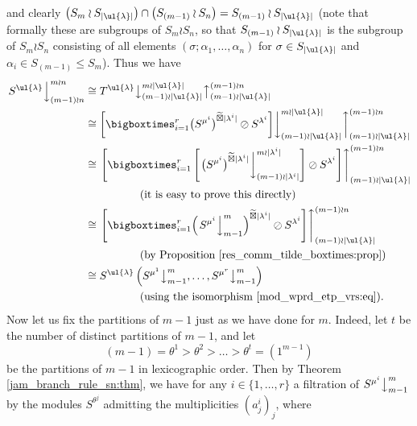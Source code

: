 and clearly $\bigl(S_m \wr S_{|\ul{\lambda}|}\bigr) \cap \bigl(S_{(m-1)} \wr S_n\bigr) = S_{(m-1)} \wr S_{|\ul{\lambda}|}$ (note that formally these
are subgroups of $S_m \wr S_n$, so that $S_{(m-1)} \wr S_{|\ul{\lambda}|}$ is the subgroup of $S_m \wr S_n$ consisting of all elements
$(\sigma;\alpha_1,\ldots,\alpha_n)$ for $\sigma \in S_{|\ul{\lambda}|}$ and $\alpha_i \in S_{(m-1)} \leqslant S_m$). Thus we have
\begin{align*}
\left.S^{\ul{\lambda}}\right\downarrow^{m \wr n}_{(m-1) \wr n}
&\cong T^{\ul{\lambda}}
\bigl\downarrow^{m{\wr}|\ul{\lambda}|}_{(m-1){\wr}|\ul{\lambda}|}
\bigl\uparrow^{(m-1) \wr n}_{(m-1){\wr}|\ul{\lambda}|}\\
&\cong
\left[\bigboxtimes^r_{i=1} \bigl(S^{\mu^i}\bigr)^{\widetilde\boxtimes |\lambda^i|}\oslash S^{\lambda^i}\right]
\biggr\downarrow^{m{\wr}|\ul{\lambda}|}_{(m-1){\wr}|\ul{\lambda}|}
\biggr\uparrow^{(m-1) \wr n}_{(m-1){\wr}|\ul{\lambda}|}\\
&\cong
\left.\left[
\bigboxtimes^r_{i=1} \left[\left.\bigl(S^{\mu^i}\bigr)^{\widetilde\boxtimes |\lambda^i|}
\right\downarrow^{m \wr |\lambda^i|}_{(m-1) \wr |\lambda^i|}\right]
\oslash S^{\lambda^i}\right]\right\uparrow^{(m-1) \wr n}_{(m-1){\wr}|\ul{\lambda}|}\\
&\hspace{5em}\text{(it is easy to prove this directly)}\\
&\cong
\left.\left[
\bigboxtimes^r_{i=1} \Bigl(\left.S^{\mu^i}\right\downarrow^{m}_{m-1}\Bigr)^{\widetilde\boxtimes |\lambda^i|}
\oslash S^{\lambda^i}\right]\right\uparrow^{(m-1) \wr n}_{(m-1){\wr}|\ul{\lambda}|}\\
&\hspace{5em}\text{(by Proposition \ref{res_comm_tilde_boxtimes:prop})}\\
&\cong
S^{\ul{\lambda}}\left(S^{\mu^1}\bigr\downarrow^m_{m-1},\ldots,S^{\mu^r}\bigr\downarrow^m_{m-1}\right)\\
&\hspace{5em}\text{(using the isomorphism \eqref{mod_wprd_etp_vrs:eq}).}
\end{align*}
Now let us fix the partitions of $m-1$ just as we have done for $m$. Indeed, let $t$ be the number of distinct partitions of $m-1$, and
let
\[ (m-1) = \theta^1 > \theta^2 > \ldots > \theta^t = (1^{m-1}) \]
be the partitions of $m-1$ in lexicographic order. Then by Theorem \ref{jam_branch_rule_sn:thm}, we have for any $i \in \{1,\ldots,r\}$
a filtration of $S^{\mu^i}\bigr\downarrow^{m}_{m-1}$ by the modules $S^{\theta^j}$ admitting the multiplicities $(a^i_j)_j$, where
